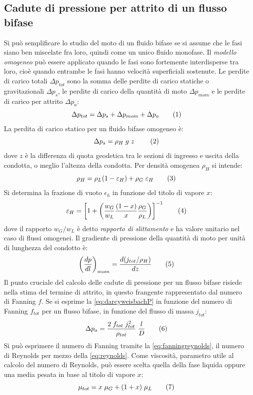 \subsection{Cadute di pressione per attrito di un flusso bifase}
Si può semplificare lo studio del moto di un fluido bifase se si assume che le fasi siano ben miscelate fra loro, quindi come un unico fluido monofase. Il \textit{modello omogeneo} può essere applicato quando le fasi sono fortemente interdisperse tra loro, cioè quando entrambe le fasi hanno velocità superficiali sostenute. Le perdite di carico totali \(\Delta p_{tot}\) sono la somma delle perdite di carico statiche o gravitazionali \(\Delta p_s\), le perdite di carico della quantità di moto \(\Delta p_{mom}\) e le perdite di carico per attrito \(\Delta p_a\): 
\[\Delta p_{tot} = \Delta p_s +\Delta p_{mom} + \Delta p_a \addtag \label{eq:perditetot}\]
La perdita di carico statico per un fluido bifase omogeneo è:
\[\Delta p_s = \rho_H \; g \; z\ \addtag \]
dove \(z\) è la differenza di quota geodetica tra le sezioni di ingresso e uscita della condotta, o meglio l'altezza della condotta. Per densità omogenea \(\rho_H\) si intende:
\[\rho_H=\rho_L(1-\epsilon_H)+\rho_G \; \epsilon_H \addtag \label{eq:omogenea} \]
Si determina la frazione di vuoto \(\epsilon_h\) in funzione del titolo di vapore \(x\):
\[\epsilon_H = \left[ 1+ \left( \dfrac{w_G}{w_L} \dfrac{(1-x)}{x} \dfrac{\rho_G}{\rho_L} \right) \right]^{-1} \addtag \]
dove il rapporto \(w_G/w_L\) è detto \textit{rapporto di slittamento} e ha valore unitario nel caso di flussi omogenei. Il gradiente di pressione della quantità di moto per unità di lunghezza del condotto è:
\[\left( \dfrac{dp}{dl} \right)_{mom}=\dfrac{d(j_{tot}/\rho_H)}{dz} \addtag \]
Il punto cruciale del calcolo delle cadute di pressione per un flusso bifase risiede nella stima del termine di attrito, in questo frangente rappresentato dal numero di Fanning \(f\). Se si esprime la \eqref{eq:darcyweisbachP} in funzione del numero di Fanning \(f_{tot}\) per un flusso bifase, in funzione del flusso di massa \(j_{tot}\):
\[\Delta p_a = \dfrac{2 \; f_{tot} \; j_{tot}^2}{\rho_{tot}} \; \dfrac{l}{D} \addtag \label{eq:darcyweisbachfanning2f} \]
Si può esprimere il numero di Fanning tramite la \eqref{eq:fanningreynolds}, il numero di Reynolds per mezzo della \eqref{eq:reynolds}. Come viscosità, parametro utile al calcolo del numero di Reynolds, può essere scelta quella della fase liquida oppure una media pesata in base al titolo di vapore \(x\):
\[\mu_{tot} =x \; \mu_G + (1+x) \; \mu_L \addtag \]
\\
